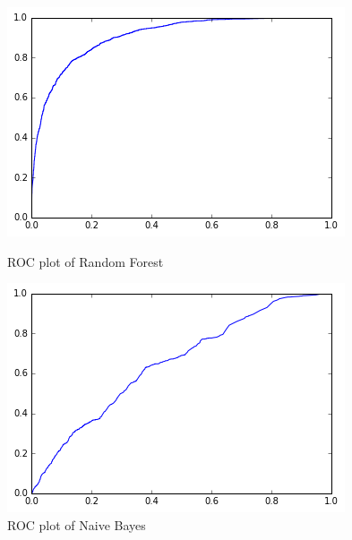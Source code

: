 \documentclass[11pt]{article}
\begin{document}
\begin{figure}[!ht]
\centering
\begin{minipage}{.5\textwidth}
  \centering
  \includegraphics[width=0.8\linewidth]{rf_rocplot.png}
  \caption{ROC plot of Random Forest}
\end{minipage}%
\begin{minipage}{.5\textwidth}
  \centering
  \includegraphics[width=0.8\linewidth]{nb_rocplot.png}
  \caption{ROC plot of Naive Bayes}
\end{minipage}%


\end{figure}
\end{document}
